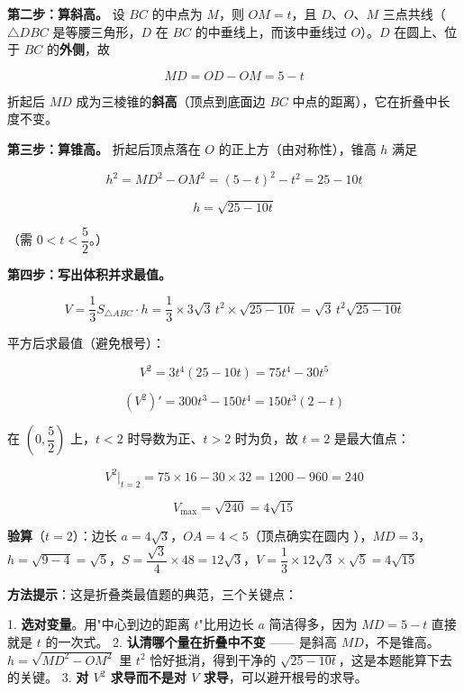 \textbf{第二步：算斜高。} 设 $BC$ 的中点为 $M$，则 $OM=t$，且 $D$、$O$、$M$ 三点共线（$\triangle DBC$ 是等腰三角形，$D$ 在 $BC$ 的中垂线上，而该中垂线过 $O$）。$D$ 在圆上、位于 $BC$ 的\textbf{外侧}，故

\[MD=OD-OM=5-t\]

折起后 $MD$ 成为三棱锥的\textbf{斜高}（顶点到底面边 $BC$ 中点的距离），它在折叠中长度不变。

\textbf{第三步：算锥高。} 折起后顶点落在 $O$ 的正上方（由对称性），锥高 $h$ 满足

\[h^{2}=MD^{2}-OM^{2}=(5-t)^{2}-t^{2}=25-10t\]

\[h=\sqrt{25-10t}\]

（需 $0<t<\dfrac52$。）

\textbf{第四步：写出体积并求最值。}

\[V=\frac13S_{\triangle ABC}\cdot h=\frac13\times3\sqrt3\,t^{2}\times\sqrt{25-10t}=\sqrt3\,t^{2}\sqrt{25-10t}\]

平方后求最值（避免根号）：

\[V^{2}=3t^{4}(25-10t)=75t^{4}-30t^{5}\]

\[\left(V^{2}\right)'=300t^{3}-150t^{4}=150t^{3}(2-t)\]

在 $\left(0,\dfrac52\right)$ 上，$t<2$ 时导数为正、$t>2$ 时为负，故 $t=2$ 是最大值点：

\[V^{2}\Big|_{t=2}=75\times16-30\times32=1200-960=240\]

\[V_{\max}=\sqrt{240}=4\sqrt{15}\]

\textbf{验算}（$t=2$）：边长 $a=4\sqrt3$，$OA=4<5$（顶点确实在圆内 ），$MD=3$，$h=\sqrt{9-4}=\sqrt5$，$S=\dfrac{\sqrt3}4\times48=12\sqrt3$，$V=\dfrac13\times12\sqrt3\times\sqrt5=4\sqrt{15}$ 


\begin{gktip}
\textbf{方法提示}：这是折叠类最值题的典范，三个关键点：

1. \textbf{选对变量}。用"中心到边的距离 $t$"比用边长 $a$ 简洁得多，因为 $MD=5-t$ 直接就是 $t$ 的一次式。
2. \textbf{认清哪个量在折叠中不变} —— 是斜高 $MD$，不是锥高。$h=\sqrt{MD^{2}-OM^{2}}$ 里 $t^{2}$ 恰好抵消，得到干净的 $\sqrt{25-10t}$，这是本题能算下去的关键。
3. \textbf{对 $V^{2}$ 求导而不是对 $V$ 求导}，可以避开根号的求导。
\end{gktip}

\par\medskip



